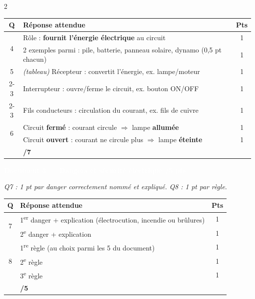 \documentclass[10pt,a4paper,landscape]{article}
\newcommand{\exotitle}[2]{%
  \noindent\colorbox{exoheader}{%
    \parbox{\dimexpr\linewidth-2\fboxsep\relax}{%
      \textcolor{white}{\textbf{\large #1 \hfill #2}}%
    }%
  }%
}
\begin{document}
\begin{multicols}{2}
\begin{tabularx}{\linewidth}{|c|X|c|}
  \hline
  \rowcolor{exolight}
  \textbf{Q} & \textbf{Réponse attendue} & \textbf{Pts} \\
  \hline
  \multirow{2}{*}{4} & Rôle : \textbf{fournit l'énergie électrique} au circuit & 1 \\
  \cline{2-3}
  & 2 exemples parmi : pile, batterie, panneau solaire, dynamo (0,5 pt chacun) & 1 \\
  \hline
  5 & \textit{(tableau)} Récepteur : convertit l'énergie, ex. lampe/moteur & 1 \\
  \cline{2-3}
  & Interrupteur : ouvre/ferme le circuit, ex. bouton ON/OFF & 1 \\
  \cline{2-3}
  & Fils conducteurs : circulation du courant, ex. fils de cuivre & 1 \\
  \hline
  \multirow{2}{*}{6} & Circuit \textbf{fermé} : courant circule $\Rightarrow$ lampe \textbf{allumée} & 1 \\
  \cline{2-3}
  & Circuit \textbf{ouvert} : courant ne circule plus $\Rightarrow$ lampe \textbf{éteinte} & 1 \\
  \hline
  \rowcolor{totalrow}
  \multicolumn{2}{|r|}{\textbf{Sous-total Document 2}} & \textbf{/7} \\
  \hline
\end{tabularx}

\vspace{4mm}

\exotitle{Document 3 --- Dangers et sécurité électrique}{/5 pts}

\vspace{1mm}

{\footnotesize\textit{Q7 : 1 pt par danger correctement nommé et expliqué. Q8 : 1 pt par règle.}}

\vspace{1mm}

\begin{tabularx}{\linewidth}{|c|X|c|}
  \hline
  \rowcolor{exolight}
  \textbf{Q} & \textbf{Réponse attendue} & \textbf{Pts} \\
  \hline
  \multirow{2}{*}{7} & 1\textsuperscript{er} danger + explication (électrocution, incendie ou brûlures) & 1 \\
  \cline{2-3}
  & 2\textsuperscript{e} danger + explication & 1 \\
  \hline
  \multirow{3}{*}{8} & 1\textsuperscript{re} règle (au choix parmi les 5 du document) & 1 \\
  \cline{2-3}
  & 2\textsuperscript{e} règle & 1 \\
  \cline{2-3}
  & 3\textsuperscript{e} règle & 1 \\
  \hline
  \rowcolor{totalrow}
  \multicolumn{2}{|r|}{\textbf{Sous-total Document 3}} & \textbf{/5} \\
  \hline
\end{tabularx}


\end{multicols}
\end{document}
